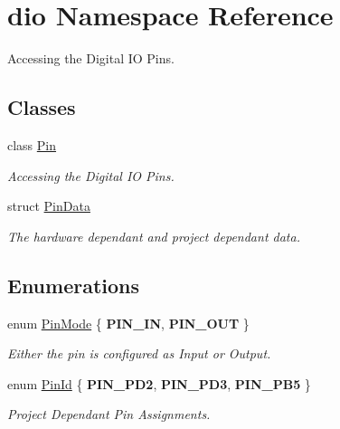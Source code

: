 \hypertarget{namespacedio}{\section{dio Namespace Reference}
\label{namespacedio}
}


Accessing the Digital I\+O Pins.  


\subsection*{Classes}
\begin{DoxyCompactItemize}
\item 
class \hyperlink{classdio_1_1Pin}{Pin}
\begin{DoxyCompactList}\small\item\em Accessing the Digital I\+O Pins. \end{DoxyCompactList}\item 
struct \hyperlink{structdio_1_1PinData}{Pin\+Data}
\begin{DoxyCompactList}\small\item\em The hardware dependant and project dependant data. \end{DoxyCompactList}\end{DoxyCompactItemize}
\subsection*{Enumerations}
\begin{DoxyCompactItemize}
\item 
\hypertarget{namespacedio_a24514e0c3dce0933bd4a7389f4cf20c4}{enum \hyperlink{namespacedio_a24514e0c3dce0933bd4a7389f4cf20c4}{Pin\+Mode} \{ {\bfseries P\+I\+N\+\_\+\+I\+N}, 
{\bfseries P\+I\+N\+\_\+\+O\+U\+T}
 \}}\label{namespacedio_a24514e0c3dce0933bd4a7389f4cf20c4}

\begin{DoxyCompactList}\small\item\em Either the pin is configured as Input or Output. \end{DoxyCompactList}\item 
\hypertarget{namespacedio_aafaaf07a83434a2e2e27969628cd4606}{enum \hyperlink{namespacedio_aafaaf07a83434a2e2e27969628cd4606}{Pin\+Id} \{ {\bfseries P\+I\+N\+\_\+\+P\+D2}, 
{\bfseries P\+I\+N\+\_\+\+P\+D3}, 
{\bfseries P\+I\+N\+\_\+\+P\+B5}
 \}}\label{namespacedio_aafaaf07a83434a2e2e27969628cd4606}

\begin{DoxyCompactList}\small\item\em Project Dependant Pin Assignments. \end{DoxyCompactList}\end{DoxyCompactItemize}
